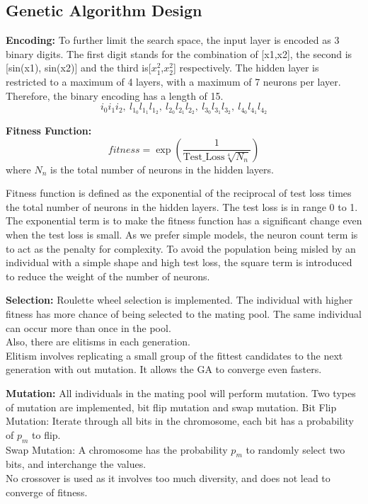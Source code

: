 \documentclass[12pt]{article}
\begin{document}
\subsection{Genetic Algorithm Design}
\noindent \textbf{Encoding: } To further limit the search space, the input layer is encoded as 3 binary digits. The first digit stands for the combination of [x1,x2], the second is [sin(x1), sin(x2)] and the third is[$x_1^2$,$x_2^2$] respectively. The hidden layer is restricted to a maximum of 4 layers, with a maximum of 7 neurons per layer.\\
Therefore, the binary encoding has a length of 15. 
\[
{i_0i_1i_2,\ l_{1_0}l_{1_1}l_{1_2},\ l_{2_0}l_{2_1}l_{2_2},\ l_{3_0}l_{3_1}l_{3_2},\ l_{4_0}l_{4_1}l_{4_2}}
\]

\noindent \textbf{Fitness Function: }
\[
fitness = \exp(\frac1{\text{Test\_Loss} \sqrt[4]{N_n}})
\]
where $N_n$ is the total number of neurons in the hidden layers.

Fitness function is defined as the exponential of the reciprocal of test loss times the total number of neurons in the hidden layers. The test loss is in range 0 to 1. The exponential term is to make the fitness function has a significant change even when the test loss is small. As we prefer simple models, the neuron count term is to act as the penalty for complexity. To avoid the population being misled by an individual with a simple shape and high test loss, the square term is introduced to reduce the weight of the number of neurons.

\noindent \textbf{Selection: }
Roulette wheel selection is implemented. The individual with higher fitness has more chance of being selected to the mating pool. The same individual can occur more than once in the pool.\\
Also, there are elitisms in each generation. \\
Elitism involves replicating a small group of the fittest candidates to the next generation with out mutation. It allows the GA to converge even fasters.

\noindent \textbf{Mutation: }
All individuals in the mating pool will perform mutation.
Two types of mutation are implemented, bit flip mutation and swap mutation. 
Bit Flip Mutation: Iterate through all bits in the chromosome, each bit has a probability of $p_m$ to flip.\\
Swap Mutation: A chromosome has the probability $p_m$ to randomly select two bits, and interchange the values.\\
No crossover is used as it involves too much diversity, and does not lead to converge of fitness.
\end{document}

